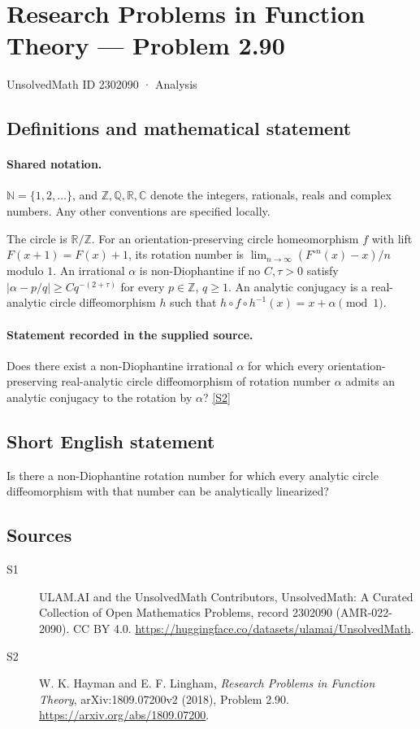 \documentclass[11pt]{article}
\newcommand{\sref}[2]{\hyperlink{source:#1:#2}{[S#2]}}
\begin{document}
\setcounter{section}{2302089}
\section{Research Problems in Function Theory — Problem 2.90}\label{2302090}
{\small\sffamily UnsolvedMath ID 2302090 · Analysis}
\subsection{Definitions and mathematical statement}

\paragraph{Shared notation.}$\mathbb N=\{1,2,\ldots\}$, and $\mathbb Z,\mathbb Q,\mathbb R,\mathbb C$ denote the integers, rationals, reals and complex numbers. Any other conventions are specified locally.


The circle is $\mathbb R/\mathbb Z$. For an orientation-preserving circle homeomorphism $f$ with lift $F(x+1)=F(x)+1$, its rotation number is $\lim_{n\to\infty}(F^{\circ n}(x)-x)/n$ modulo $1$. An irrational $\alpha$ is non-Diophantine if no $C,\tau>0$ satisfy $|\alpha-p/q|\geq Cq^{-(2+\tau)}$ for every $p\in\mathbb Z$, $q\geq1$. An analytic conjugacy is a real-analytic circle diffeomorphism $h$ such that $h\circ f\circ h^{-1}(x)=x+\alpha\pmod1$.
\paragraph{Statement recorded in the supplied source.}
Does there exist a non-Diophantine irrational $\alpha$ for which every orientation-preserving real-analytic circle diffeomorphism of rotation number $\alpha$ admits an analytic conjugacy to the rotation by $\alpha$? \sref{2302090}{2}
\subsection{Short English statement}
Is there a non-Diophantine rotation number for which every analytic circle diffeomorphism with that number can be analytically linearized?
\subsection{Sources}
\begin{description}
\item[\hypertarget{source:2302090:1}{S1}] ULAM.AI and the UnsolvedMath Contributors, UnsolvedMath: A Curated Collection of Open Mathematics Problems, record 2302090 (AMR-022-2090). CC BY 4.0. \url{https://huggingface.co/datasets/ulamai/UnsolvedMath}.
\item[\hypertarget{source:2302090:2}{S2}] W. K. Hayman and E. F. Lingham, \emph{Research Problems in Function Theory}, arXiv:1809.07200v2 (2018), Problem 2.90. \url{https://arxiv.org/abs/1809.07200}.
\end{description}
\label{end:2302090}
\end{document}
